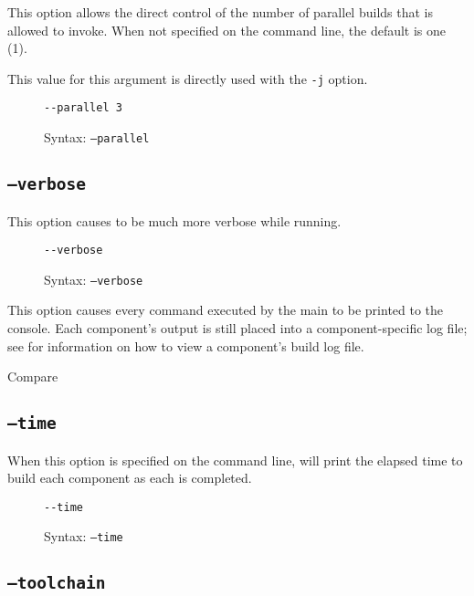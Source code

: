 This option allows the direct control of the number of parallel builds
that \make is allowed to invoke.  When not specified on the command
line, the default is one (1).

This value for this argument is directly used with the \gnumake
\texttt{-j} option.

\begin{figure}[h]
  \hrulefill
\begin{verbatim}
--parallel 3
\end{verbatim}
  \caption{Syntax: \texttt{--parallel}}
  \hrulefill
\end{figure}

\subsection{\texttt{--verbose}}\label{usinglmsbw:verbose}

This option causes \lmsbw to be much more verbose while running.

\begin{figure}[h]
  \hrulefill
\begin{verbatim}
--verbose
\end{verbatim}
  \caption{Syntax: \texttt{--verbose}}
  \hrulefill
\end{figure}

This option causes every command executed by the main \makefile to be
printed to the console.  Each component's \make output is still placed
into a component-specific log file; see
 for information on how to view a
component's build log file.


Compare 

\subsection{\texttt{--time}}\label{usinglmsbw:time}

When this option is specified on the command line, \lmsbw will print
the elapsed time to build each component as each is completed.

\begin{figure}[h]
  \hrulefill
\begin{verbatim}
--time
\end{verbatim}
  \caption{Syntax: \texttt{--time}}
  \hrulefill
\end{figure}

\subsection{\texttt{--toolchain}}\label{usinglmsbw:toolchain}

